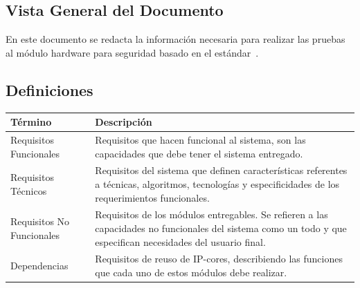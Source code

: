 \documentclass[a4paper]{article}
\begin{document}
\subsection{Vista General del Documento}

En este documento se redacta la información necesaria para realizar las pruebas al módulo hardware para seguridad basado en el estándar~\cite{1059-1993-std:1994}.

  \subsection{Definiciones}
    \FloatBarrier
    \begin{table}[H]
      \begin{center}
        \begin{tabular}[pos]{|m{5cm} | m{9cm}|} 
          \hline
          \cellcolor[gray]{0.9}\textbf{Término} & \cellcolor[gray]{0.9}\textbf{Descripción} \\ \hline
          Requisitos Funcionales & Requisitos que hacen funcional al sistema, son las capacidades que debe tener el sistema entregado.  \\ \hline
                    Requisitos Técnicos & Requisitos del sistema que definen características referentes a técnicas, algoritmos, tecnologías y especificidades de los requerimientos funcionales.  \\ \hline
          Requisitos No Funcionales & Requisitos de los módulos entregables.  Se refieren a las capacidades no funcionales del sistema como un todo y que especifican necesidades del usuario final.  \\ \hline
          Dependencias & Requisitos de reuso de IP-cores, describiendo las funciones que cada uno de estos módulos debe realizar. \\ \hline
        \end{tabular}
      \end{center}
    \end{table}  

\end{document}
